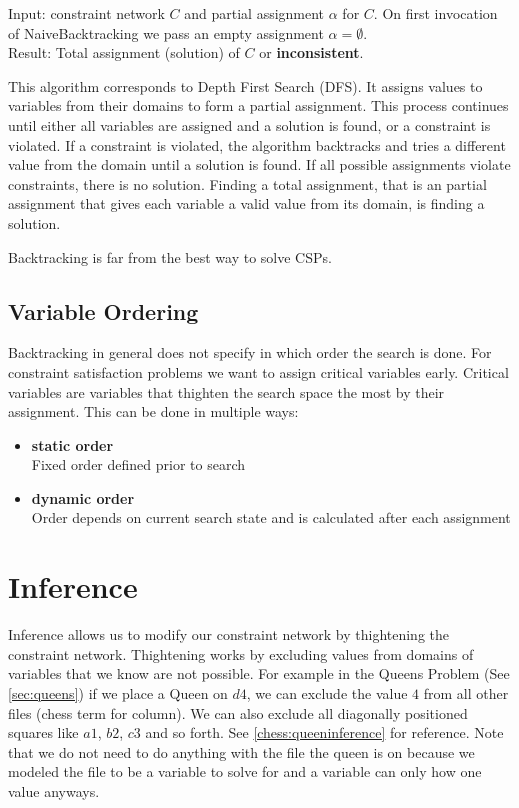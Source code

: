 Input: constraint network $C$ and partial assignment $\alpha$ for $C$. On first invocation of NaiveBacktracking we pass an empty assignment $\alpha = \emptyset$. \\
Result: Total assignment (solution) of $C$ or \textbf{inconsistent}.

This algorithm corresponds to Depth First Search (DFS). It assigns values to variables from their domains to form a partial assignment. This process continues until either all variables are assigned and a solution is found, or a constraint is violated. If a constraint is violated, the algorithm backtracks and tries a different value from the domain until a solution is found. If all possible assignments violate constraints, there is no solution. Finding a total assignment, that is an partial assignment that gives each variable a valid value from its domain, is finding a solution.

Backtracking is far from the best way to solve CSPs.

\subsection{Variable Ordering}

Backtracking in general does not specify in which order the search is done. For constraint satisfaction problems we want to assign critical variables early. Critical variables are variables that thighten the search space the most by their assignment. This can be done in multiple ways:
\begin{itemize}
	\item \textbf{static order} \\
	      Fixed order defined prior to search
	\item \textbf{dynamic order} \\
	      Order depends on current search state and is calculated after each assignment
\end{itemize}

\section{Inference} \label{inference}

Inference allows us to modify our constraint network by thightening the constraint network. Thightening works by excluding values from domains of variables that we know are not possible. For example in the Queens Problem (See \ref{sec:queens}) if we place a Queen on $d4$, we can exclude the value $4$ from all other files (chess term for column). We can also exclude all diagonally positioned squares like $a1$, $b2$, $c3$ and so forth. See \ref{chess:queeninference} for reference. Note that we do not need to do anything with the file the queen is on because we modeled the file to be a variable to solve for and a variable can only how one value anyways.

